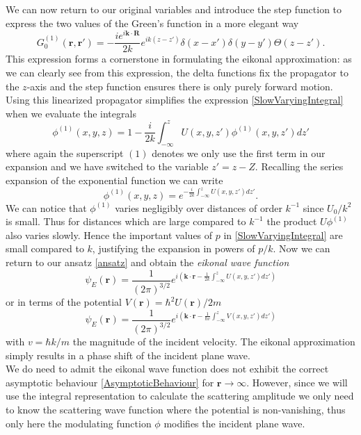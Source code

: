 \documentclass[11pt]{article}
\numberwithin{equation}{section}
\begin{document}
We can now return to our original variables and introduce the step function to express the two values of the Green's function in a more elegant way
\begin{equation}
	G^{(1)}_0(\mathbf{r},\mathbf{r}') = - \frac{ie^{i\mathbf{k}\cdot \mathbf{R}}}{2k} e^{ik(z-z')}\delta(x-x')\delta(y-y')\Theta(z-z').
\end{equation}
This expression forms a cornerstone in formulating the eikonal approximation: as we can clearly see from this expression, the delta functions fix the propagator to the $z$-axis and the step function ensures there is only purely forward motion. Using this linearized propagator simplifies the expression \eqref{SlowVaryingIntegral} when we evaluate the integrals
\begin{equation}
	\phi^{(1)} (x,y,z) = 1 - \frac{i}{2k} \int^{z}_{-\infty} U(x,y,z')\phi^{(1)}(x,y,z')dz'
\end{equation}
where again the superscript $(1)$ denotes we only use the first term in our expansion and we have switched to the variable $z' = z-Z$. Recalling the series expansion of the exponential function we can write
\begin{equation}
	\phi^{(1)} (x,y,z) = e^{-\frac{i}{2k} \int^{z}_{-\infty} U(x,y,z')dz'}.
\end{equation}
We can notice that $\phi^{(1)}$ varies negligibly over distances of order $k^{-1}$ since $U_0/k^2$ is small. Thus for distances which are large compared to $k^{-1}$ the product $U\phi^{(1)}$ also varies slowly. Hence the important values of $p$ in \eqref{SlowVaryingIntegral} are small compared to $k$, justifying the expansion in powers of $p/k$. Now we can return to our ansatz \eqref{ansatz} and obtain the \emph{eikonal wave function}
\begin{equation}
	\psi_E(\mathbf{r}) = \frac{1}{(2\pi)^{3/2}} e^{i\left(\mathbf{k}\cdot \mathbf{r} - \frac{1}{2k}\int^{z}_{-\infty} U(x,y,z')dz'\right)}
\end{equation}
or in terms of the potential $V(\mathbf{r}) = \hbar^2U(\mathbf{r}) / 2m$
\begin{equation}
	\psi_E(\mathbf{r}) = \frac{1}{(2\pi)^{3/2}} e^{i\left(\mathbf{k}\cdot \mathbf{r} - \frac{1}{\hbar v}\int^{z}_{-\infty} V(x,y,z')dz'\right)}
\end{equation}
with $v = \hbar k /m$ the magnitude of the incident velocity. The eikonal approximation simply results in a phase shift of the incident plane wave.\\
We do need to admit the eikonal wave function does not exhibit the correct asymptotic behaviour \eqref{AsymptoticBehaviour} for $\mathbf{r} \rightarrow \infty$. However, since we will use the integral representation to calculate the scattering amplitude we only need to know the scattering wave function where the potential is non-vanishing, thus only here the modulating function $\phi$ modifies the incident plane wave.\\
\end{document}
